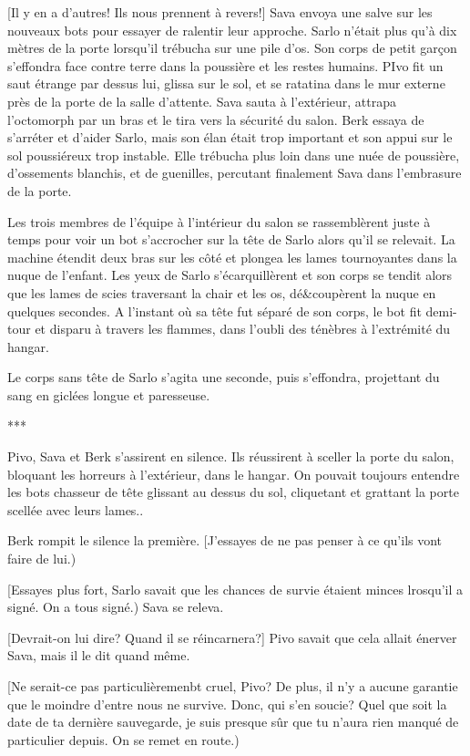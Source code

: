 [Il y en a d'autres! Ils nous prennent à revers!] Sava envoya une salve sur les nouveaux bots pour essayer de ralentir leur approche. Sarlo n'était plus qu'à dix mètres de la porte lorsqu'il trébucha sur une pile d'os. Son corps de petit garçon s'effondra face contre terre dans la poussière et les restes humains. PIvo fit un saut étrange par dessus lui, glissa sur le sol, et se ratatina dans le mur externe près de la porte de la salle d'attente. Sava sauta à l'extérieur, attrapa l'octomorph par un bras et le tira vers la sécurité du salon. Berk essaya de s'arréter et d'aider Sarlo, mais son élan était trop important et son appui sur le sol poussiéreux trop instable. Elle trébucha plus loin dans une nuée de poussière, d'ossements blanchis, et de guenilles, percutant finalement Sava dans l'embrasure de la porte. 

Les trois membres de l'équipe à l'intérieur du salon se rassemblèrent juste à temps pour voir un bot s'accrocher sur la tête de Sarlo alors qu'il se relevait. La machine étendit deux bras sur les côté et plongea les lames tournoyantes dans la nuque de l'enfant. Les yeux de Sarlo s'écarquillèrent et son corps se tendit alors que les lames de scies traversant la chair et les os, dé&coupèrent la nuque en quelques secondes. A l'instant où sa tête fut séparé de son corps, le bot fit demi-tour et disparu à travers les flammes, dans l'oubli des ténèbres à l'extrémité du hangar. 

Le corps sans tête de Sarlo s'agita une seconde, puis s'effondra, projettant du sang en giclées longue et paresseuse. 

\begin{center} *** \end{center} 

Pivo, Sava et Berk s'assirent en silence. Ils réussirent à sceller la porte du salon, bloquant les horreurs à l'extérieur, dans le hangar. On pouvait toujours entendre les bots chasseur de tête glissant au dessus du sol, cliquetant et grattant la porte scellée avec leurs lames.. 

Berk rompit le silence la première. [J'essayes de ne pas penser à ce qu'ils vont faire de lui.) 

[Essayes plus fort, Sarlo savait que les chances de survie étaient minces lrosqu'il a signé. On a tous signé.) Sava se releva. 

[Devrait-on lui dire? Quand il se réincarnera?] Pivo savait que cela allait énerver Sava, mais il le dit quand même. 

[Ne serait-ce pas particulièremenbt cruel, Pivo? De plus, il n'y a aucune garantie que le moindre d'entre nous ne survive. Donc, qui s'en soucie? Quel que soit la date de ta dernière sauvegarde, je suis presque sûr que tu n'aura rien manqué de particulier depuis. On se remet en route.) 


